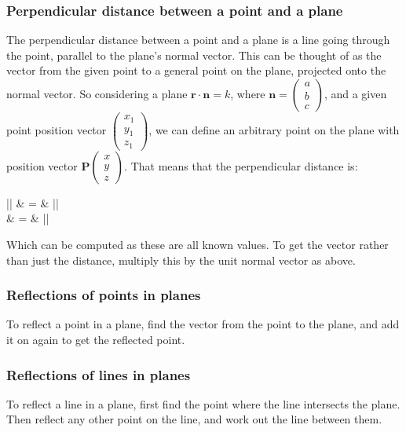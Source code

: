 \subsubsection{Perpendicular distance between a point and a plane}
The perpendicular distance between a point and a plane is a line going through the point, parallel to the plane's normal vector. This can be thought of as the vector from the given point to a general point on the plane, projected onto the normal vector. So considering a plane $\mathbf{r} \cdot \mathbf{n}=k$, where $\mathbf{n}=\begin{pmatrix}a\\b\\c\end{pmatrix}$, and a given point position vector $\begin{pmatrix}x_1\\y_1\\z_1\end{pmatrix}$, we can define an arbitrary point on the plane with position vector $\mathbf{P}\begin{pmatrix}x\\y\\z\end{pmatrix}$. That means that the perpendicular distance is:
\begin{ea}[rCl]
	\left|\right|
	& = & \left|\right|
	\nonumber\\
	& = & \left|\right|
\end{ea}
Which can be computed as these are all known values. To get the vector rather than just the distance, multiply this by the unit normal vector as above.

\subsubsection{Reflections of points in planes}
To reflect a point in a plane, find the vector from the point to the plane, and add it on again to get the reflected point.

\subsubsection{Reflections of lines in planes}
To reflect a line in a plane, first find the point where the line intersects the plane. Then reflect any other point on the line, and work out the line between them.
